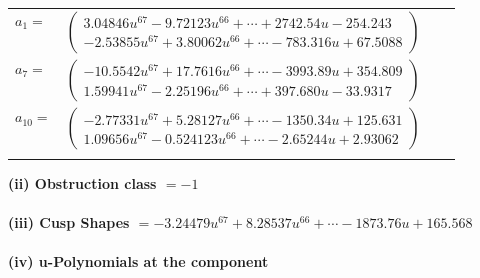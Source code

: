 \documentclass[1p]{elsarticle_modified}
\theoremstyle{definition}
\begin{document}
\begin{tabular}{m{7pt} m{180pt} m{7pt} m{180pt} }
\flushright $a_{1}=$&$\begin{pmatrix}3.04846 u^{67}-9.72123 u^{66}+\cdots+2742.54 u-254.243\\-2.53855 u^{67}+3.80062 u^{66}+\cdots-783.316 u+67.5088\end{pmatrix}$ \\
\flushright $a_{7}=$&$\begin{pmatrix}-10.5542 u^{67}+17.7616 u^{66}+\cdots-3993.89 u+354.809\\1.59941 u^{67}-2.25196 u^{66}+\cdots+397.680 u-33.9317\end{pmatrix}$ \\
\flushright $a_{10}=$&$\begin{pmatrix}-2.77331 u^{67}+5.28127 u^{66}+\cdots-1350.34 u+125.631\\1.09656 u^{67}-0.524123 u^{66}+\cdots-2.65244 u+2.93062\end{pmatrix}$\\&\end{tabular}
\flushleft \textbf{(ii) Obstruction class $= -1$}\\~\\
\flushleft \textbf{(iii) Cusp Shapes $= -3.24479 u^{67}+8.28537 u^{66}+\cdots-1873.76 u+165.568$}\\~\\
\newpage\renewcommand{\arraystretch}{1}
\flushleft \textbf{(iv) u-Polynomials at the component}\newline \\
\end{document}
